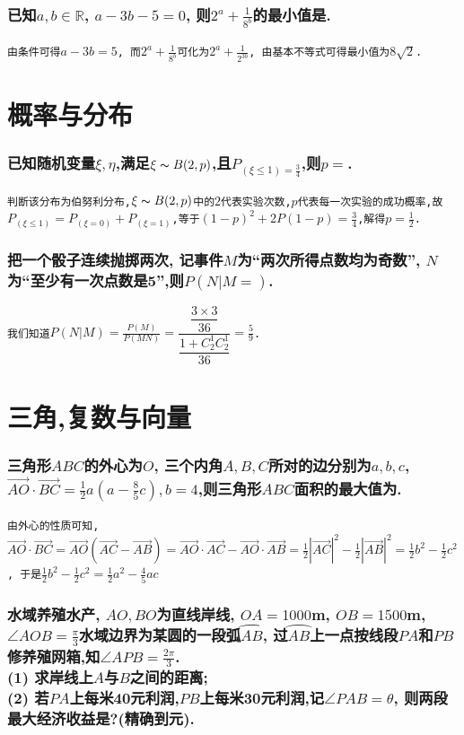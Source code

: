 \documentclass{article}
\newcommand{\1}{\underline{\makebox[1cm]{}}}
\newcommand{\2}{\underline{\makebox[2cm]{}}}
\newcommand{\3}{\underline{\makebox[3cm]{}}}
\newcommand{\4}{\underline{\makebox[4cm]{}}}
\newcommand{\lge}{\large \texttt}
\newcommand{\xl}{\overrightarrow}
\newlength{\la}
\begin{document}
\section{已知$a, b \in \mathbb{R}$, $a - 3b - 5 = 0$, 则$2^a + \frac{1}{8^b}$的最小值是\2.}
\lge{由条件可得$a - 3b = 5$, 而$2^a + \frac{1}{8^b}$可化为$2^a + \frac{1}{2^{3b}}$, 由基本不等式可得最小值为$8\sqrt{2}$.}


\newpage

\part{概率与分布}

\section{已知随机变量$\xi, \eta $,满足$\xi \thicksim B(2, p)$,且$P_{(\xi \leq 1) = \frac{3}{4}}$,则$p = $\2.}
\lge{判断该分布为伯努利分布,$\xi \thicksim B(2, p)$中的$2$代表实验次数,$p$代表每一次实验的成功概率,故$P_{(\xi \leq 1)} = P_{(\xi = 0)} + P_{(\xi = 1)}$,等于$(1 - p)^2 + 2P(1 - p) = \frac{3}{4}$,解得$p = \frac{1}{2}$.}

\section{把一个骰子连续抛掷两次, 记事件$M$为``两次所得点数均为奇数'', $N$为``至少有一次点数是5'',则$P(N | M = )$\2.}
\lge{我们知道$P(N|M) = \frac{P(M)}{P(MN)} = \dfrac{\dfrac{3 \times 3}{36}}{\dfrac{1 + C_2^1C_2^1}{36}} = \frac{5}{9}$.}


\part{三角,复数与向量}

\section{三角形$ABC$的外心为$O$, 三个内角$A, B, C$所对的边分别为$a, b, c$, $ \xl{AO} \cdot \xl{BC} = \frac{1}{2}a(a-\frac{8}{5}c), b = 4$,则三角形$ABC$面积的最大值为\2.}
\lge{由外心的性质可知, $\xl{AO} \cdot \xl{BC} = \xl{AO}(\xl{AC}-\xl{AB}) = \xl{AO} \cdot \xl{AC} - \xl{AO} \cdot \xl{AB} = \frac{1}{2}|\xl{AC}|^2 - \frac{1}{2}|\xl{AB}|^2 = \frac{1}{2}b^2 - \frac{1}{2}c^2$, 于是$
\frac{1}{2}b^2 - \frac{1}{2}c^2 = \frac{1}{2}a^2 - \frac{4}{5}ac$}

\section{水域养殖水产, $AO, BO$为直线岸线, $OA = 1000$m, $OB = 1500$m, $\angle{AOB} = \frac{\pi}{3}$水域边界为某圆的一段弧$\wideparen{AB}$, 过$\wideparen{AB}$上一点按线段$PA$和$PB$修养殖网箱,知$\angle{APB} = \frac{2\pi}{3}$.
\\(1) 求岸线上$A$与$B$之间的距离;
\\(2) 若$PA$上每米40元利润,$PB$上每米30元利润,记$\angle{PAB} = \theta$, 则两段最大经济收益是?(精确到元).
}
\end{document}
